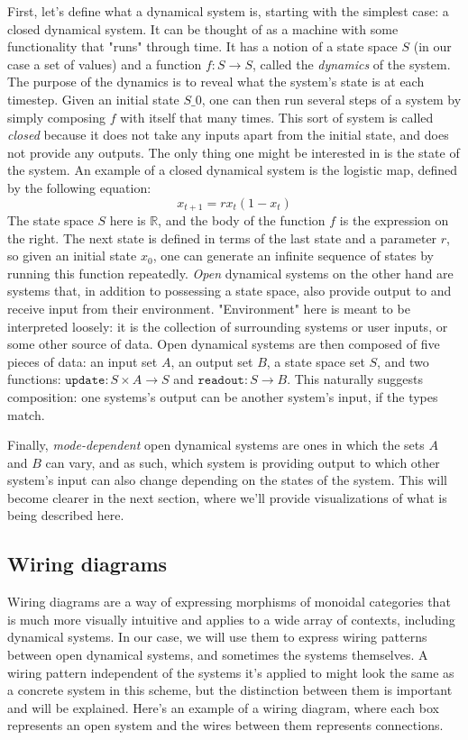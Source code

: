 First, let's define what a dynamical system is, starting with the simplest case: a closed dynamical system. It can be thought of as a machine with some functionality that "runs" through time. It has a notion of a state space $S$ (in our case a set of values) and a function $f : S \rightarrow S$, called the \textit{dynamics} of the system. The purpose of the dynamics is to reveal what the system's state is at each timestep. Given an initial state $S\_0$, one can then run several steps of a system by simply composing $f$ with itself that many times. This sort of system is called \textit{closed} because it does not take any inputs apart from the initial state, and does not provide any outputs. The only thing one might be interested in is the state of the system. An example of a closed dynamical system is the logistic map, defined by the following equation:
$$
x_{t+1} = rx_t(1 - x_t)
$$
The state space $S$ here is $\mathbb{R}$, and the body of the function $f$ is the expression on the right. The next state is defined in terms of the last state and a parameter $r$, so given an initial state $x_0$, one can generate an infinite sequence of states by running this function repeatedly.
\textit{Open} dynamical systems on the other hand are systems that, in addition to possessing a state space, also provide output to and receive input from their environment. "Environment" here is meant to be interpreted loosely: it is the collection of surrounding systems or user inputs, or some other source of data. Open dynamical systems are then composed of five pieces of data: an input set $A$, an output set $B$, a state space set $S$, and two functions: $\texttt{update} : S \times A \rightarrow S$ and $\texttt{readout} : S \rightarrow B$.  This naturally suggests composition: one systems's output can be another system's input, if the types match.

Finally, \textit{mode-dependent} open dynamical systems are ones in which the sets $A$ and $B$ can vary, and as such, which system is providing output to which other system's input can also change depending on the states of the system. This will become clearer in the next section, where we'll provide visualizations of what is being described here.

\subsection{Wiring diagrams}

Wiring diagrams are a way of expressing morphisms of monoidal categories that is much more visually intuitive and applies to a wide array of contexts, including dynamical systems\cite{operadwd}. In our case, we will use them to express wiring patterns between open dynamical systems, and sometimes the systems themselves. A wiring pattern independent of the systems it's applied to might look the same as a concrete system in this scheme, but the distinction between them is important and will be explained. Here's an example of a wiring diagram, where each box represents an open system and the wires between them represents connections.

